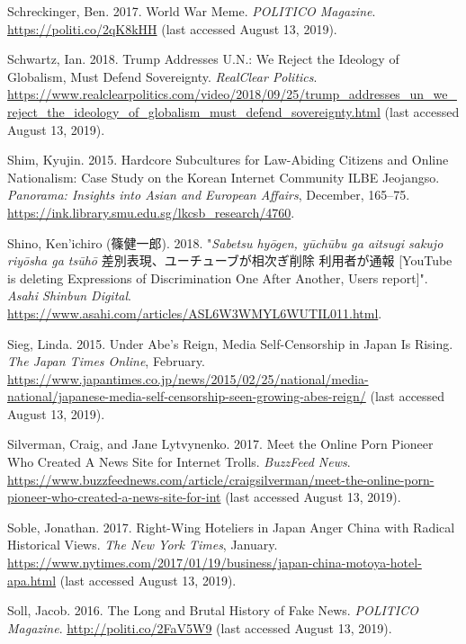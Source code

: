 \documentclass[10pt,british,A4paper,oneside]{memoir}
\begin{document}
\hypertarget{ref-schreckinger_world_2017}{}
Schreckinger, Ben. 2017. World War Meme. \emph{POLITICO Magazine}.
\url{https://politi.co/2qK8kHH} (last accessed August 13, 2019).

\hypertarget{ref-schwartz_trump_2018}{}
Schwartz, Ian. 2018. Trump Addresses U.N.: We Reject the Ideology of
Globalism, Must Defend Sovereignty. \emph{RealClear Politics}.
\url{https://www.realclearpolitics.com/video/2018/09/25/trump_addresses_un_we_reject_the_ideology_of_globalism_must_defend_sovereignty.html} (last accessed August 13, 2019).

\hypertarget{ref-shim_hardcore_2015}{}
Shim, Kyujin. 2015. Hardcore Subcultures for Law-Abiding Citizens and
Online Nationalism: Case Study on the Korean Internet Community ILBE
Jeojangso. \emph{Panorama: Insights into Asian and European Affairs},
December, 165--75.
\url{https://ink.library.smu.edu.sg/lkcsb_research/4760}.

\hypertarget{ref-shino_eng:_2018}{}
Shino, Ken'ichiro (篠健一郎). 2018. "\emph{Sabetsu hyōgen, yūchūbu ga aitsugi sakujo riyōsha ga tsūhō} 差別表現、ユーチューブが相次ぎ削除 利用者が通報 [YouTube is deleting Expressions of Discrimination One After Another, Users report]".
\emph{Asahi Shinbun Digital}.
\url{https://www.asahi.com/articles/ASL6W3WMYL6WUTIL011.html}.

\hypertarget{ref-sieg_under_2015}{}
Sieg, Linda. 2015. Under Abe's Reign, Media Self-Censorship in Japan Is
Rising. \emph{The Japan Times Online}, February.
\url{https://www.japantimes.co.jp/news/2015/02/25/national/media-national/japanese-media-self-censorship-seen-growing-abes-reign/} (last accessed August 13, 2019).

\hypertarget{ref-silverman_meet_2017}{}
Silverman, Craig, and Jane Lytvynenko. 2017. Meet the Online Porn
Pioneer Who Created A News Site for Internet Trolls. \emph{BuzzFeed
News}.
\url{https://www.buzzfeednews.com/article/craigsilverman/meet-the-online-porn-pioneer-who-created-a-news-site-for-int} (last accessed August 13, 2019).

\hypertarget{ref-soble_right-wing_2017}{}
Soble, Jonathan. 2017. Right-Wing Hoteliers in Japan Anger China with
Radical Historical Views. \emph{The New York Times}, January.
\url{https://www.nytimes.com/2017/01/19/business/japan-china-motoya-hotel-apa.html} (last accessed August 13, 2019).

\hypertarget{ref-soll_long_2016}{}
Soll, Jacob. 2016. The Long and Brutal History of Fake News.
\emph{POLITICO Magazine}. \url{http://politi.co/2FaV5W9} (last accessed August 13, 2019).
\end{document}
